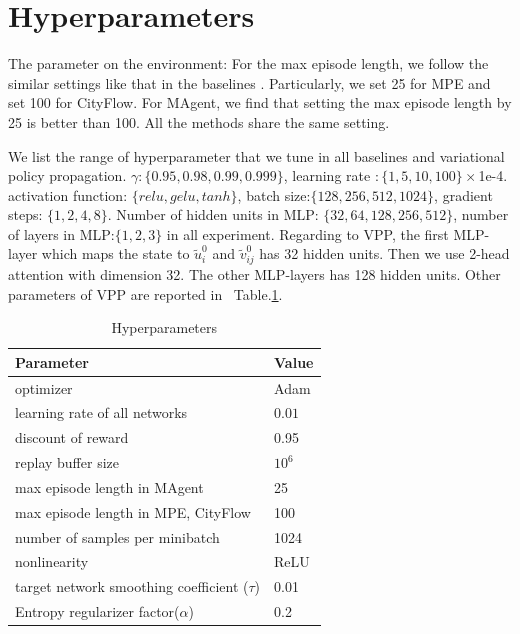 \documentclass[11pt,a4paper]{article}
\theoremstyle{definition}
\begin{document}
\section{Hyperparameters}
\label{app:hypers}

The parameter on the environment: For the max episode length, we follow the similar settings like that in the baselines \citep{lowe2017multi} . Particularly, we set 25 for MPE and set 100 for CityFlow. For MAgent, we find that setting the max episode length by 25 is better than 100.  All the methods share the same setting.


We list the range of hyperparameter that we tune in all baselines and variational policy propagation. $\gamma : \{0.95,0.98,0.99, 0.999\}$,  learning rate $:\{1,5,10,100\}\times$1e-4. activation function: $\{relu, gelu, tanh\}$, batch size:$\{128, 256, 512, 1024\}$, gradient steps: $\{1, 2, 4, 8\}$. Number of hidden units in MLP: $\{32,64,128,256,512\}$, number of layers in MLP:$\{1,2,3\}$ in all experiment. Regarding to VPP, the first MLP-layer which maps the state to $\tilde{u}_i^0$ and $\tilde{v}_{ij}^0$ has 32 hidden units. Then we use 2-head attention with dimension 32. The other MLP-layers has 128 hidden units. Other parameters of VPP are reported in ~Table.\ref{tab:shared_params}. 

\begin{table}[H]
	\renewcommand{\arraystretch}{1.1}
	\centering
	\caption{Hyperparameters}
	\label{tab:shared_params}
	\vspace{1mm}
	\begin{tabular}{|l| l| }
		\hline
		Parameter &  Value \\
		\hline
		optimizer &Adam\\
		learning rate of all networks & $0.01$\\
		discount of reward &  0.95\\
		replay buffer size & $10^6$\\
		max episode length in MAgent & 25 \\
		max episode length in MPE, CityFlow & 100 \\
		number of samples per minibatch & 1024\\
		nonlinearity & ReLU\\
		target network smoothing coefficient ($\tau$)& 0.01\\
		Entropy regularizer factor($\alpha$) & 0.2 \\
		\hline
	\end{tabular}
\end{table}
\end{document}
